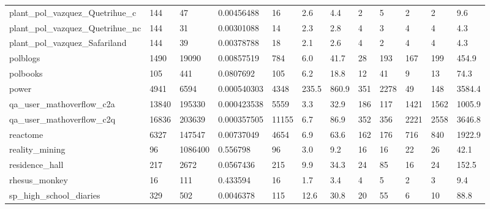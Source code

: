\begin{longtable}{llllllllllll}
 plant\_pol\_vazquez\_Quetrihue\_c                      & 144        & 47        & 0.00456488  & 16    & 2.6    & 4.4    & 2     & 5      & 2      & 2      & 9.6     \\
 plant\_pol\_vazquez\_Quetrihue\_nc                     & 144        & 31        & 0.00301088  & 14    & 2.3    & 2.8    & 4     & 3      & 4      & 4      & 4.3     \\
 plant\_pol\_vazquez\_Safariland                       & 144        & 39        & 0.00378788  & 18    & 2.1    & 2.6    & 4     & 2      & 4      & 4      & 4.3     \\
 polblogs                                           & 1490       & 19090     & 0.00857519  & 784   & 6.0    & 41.7   & 28    & 193    & 167    & 199    & 454.9   \\
 polbooks                                           & 105        & 441       & 0.0807692   & 105   & 6.2    & 18.8   & 12    & 41     & 9      & 13     & 74.3    \\
 power                                              & 4941       & 6594      & 0.000540303 & 4348  & 235.5  & 860.9  & 351   & 2278   & 49     & 148    & 3584.4  \\
 qa\_user\_mathoverflow\_c2a                           & 13840      & 195330    & 0.000423538 & 5559  & 3.3    & 32.9   & 186   & 117    & 1421   & 1562   & 1005.9  \\
 qa\_user\_mathoverflow\_c2q                           & 16836      & 203639    & 0.000357505 & 11155 & 6.7    & 86.9   & 352   & 356    & 2221   & 2558   & 3646.8  \\
 reactome                                           & 6327       & 147547    & 0.00737049  & 4654  & 6.9    & 63.6   & 162   & 176    & 716    & 840    & 1922.9  \\
 reality\_mining                                     & 96         & 1086400   & 0.556798    & 96    & 3.0    & 9.2    & 16    & 16     & 22     & 26     & 42.1    \\
 residence\_hall                                     & 217        & 2672      & 0.0567436   & 215   & 9.9    & 34.3   & 24    & 85     & 16     & 24     & 152.5   \\
 rhesus\_monkey                                      & 16         & 111       & 0.433594    & 16    & 1.7    & 3.4    & 4     & 5      & 2      & 3      & 9.4     \\
 sp\_high\_school\_diaries                             & 329        & 502       & 0.0046378   & 115   & 12.6   & 30.8   & 20    & 55     & 6      & 10     & 88.8    \\

\end{longtable}
